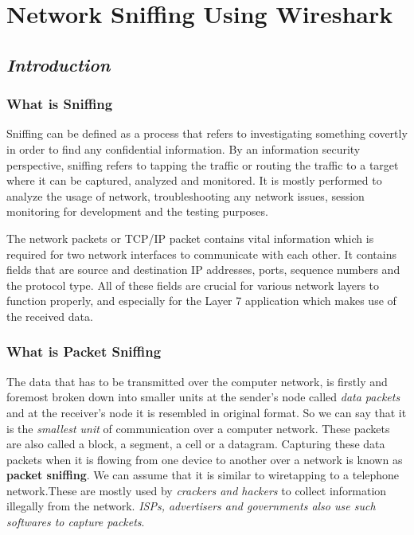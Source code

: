 \documentclass[12pt, a4paper]{report}
\begin{document}
\chapter{Network Sniffing Using Wireshark}

\section{\emph{Introduction}}

\subsection{What is Sniffing}

Sniffing can be defined as a process that refers to investigating
something covertly in order to find any confidential information. By an
information security perspective, sniffing refers to tapping the traffic
or routing the traffic to a target where it can be captured, analyzed
and monitored. It is mostly performed to analyze the usage of network,
troubleshooting any network issues, session monitoring for development
and the testing purposes.

The network packets or TCP/IP packet contains vital information which is
required for two network interfaces to communicate with each other. It
contains fields that are source and destination IP addresses, ports,
sequence numbers and the protocol type. All of these fields are crucial
for various network layers to function properly, and especially for the
Layer 7 application which makes use of the received data.

\subsection{What is Packet Sniffing}

The data that has to be transmitted over the computer network, is
firstly and foremost broken down into smaller units at the sender's node
called \emph{data packets} and at the receiver's node it is resembled in
original format. So we can say that it is the \emph{smallest unit} of
communication over a computer network. These packets are also called a
block, a segment, a cell or a datagram. Capturing these data packets
when it is flowing from one device to another over a network is known as
\textbf{packet sniffing}. We can assume that it is similar to
wiretapping to a telephone network.These are mostly used by
\emph{crackers and hackers} to collect information illegally from the
network. \emph{ISPs, advertisers and governments also use such softwares
to capture packets}.
\end{document}
